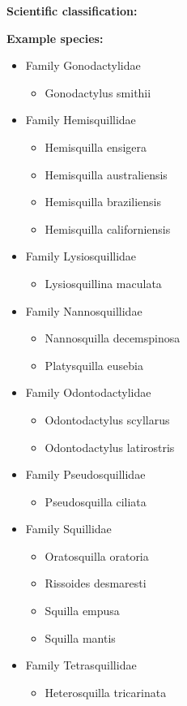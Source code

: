 \newpage

\textbf{Scientific classification:}


\textbf{Example species:}
\begin{itemize}

   \item Family Gonodactylidae
   \begin{itemize}
     \item Gonodactylus smithii
   \end{itemize}
   
   \item Family Hemisquillidae
   \begin{itemize}
     \item Hemisquilla ensigera
     \item Hemisquilla australiensis
     \item Hemisquilla braziliensis
     \item Hemisquilla californiensis
   \end{itemize}
   
   \item Family Lysiosquillidae
   \begin{itemize}
     \item Lysiosquillina maculata
   \end{itemize}

   \item Family Nannosquillidae
   \begin{itemize}
     \item Nannosquilla decemspinosa
     \item Platysquilla eusebia
   \end{itemize}

   \item Family Odontodactylidae
   \begin{itemize}
     \item Odontodactylus scyllarus
     \item Odontodactylus latirostris
   \end{itemize}

   \item Family Pseudosquillidae
   \begin{itemize}
     \item Pseudosquilla ciliata
   \end{itemize}

   \item Family Squillidae
   \begin{itemize}
     \item Oratosquilla oratoria
     \item Rissoides desmaresti
     \item Squilla empusa
     \item Squilla mantis
   \end{itemize}

   \item Family Tetrasquillidae
   \begin{itemize}
     \item Heterosquilla tricarinata
   \end{itemize}
   
\end{itemize}

